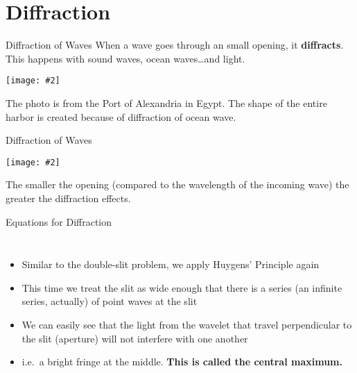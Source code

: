 \documentclass[compress,aspectratio=169]{beamer}
\newcommand{\pic}[2]{\texttt{[image: \#2]}}
\begin{document}
\section{Diffraction}

\begin{frame}{Diffraction of Waves}
  When a wave goes through an small opening, it \textbf{diffracts}. This happens
  with sound waves, ocean waves\ldots and light.
  \begin{center}
    \pic{.55}{graphics/alexandria.jpg}
  \end{center}
  The photo is from the Port of Alexandria in Egypt. The shape of the entire
  harbor is created because of diffraction of ocean wave.
\end{frame}



\begin{frame}{Diffraction of Waves}
  \begin{center}
    \pic{.6}{graphics/diffraction1.jpg}
  \end{center}
  The smaller the opening (compared to the wavelength of the incoming wave)
  the greater the diffraction effects.
\end{frame}


\begin{frame}{Equations for Diffraction}
  \begin{columns}
    
    \begin{itemize}
    \item Similar to the double-slit problem, we apply Huygens' Principle
      again
    \item This time we treat the slit as wide enough that there is a series
      (an infinite series, actually) of point waves at the slit
    \item We can easily see that the light from the wavelet that travel
      perpendicular to the slit (aperture) will not interfere with one another
    \item i.e.\ a bright fringe at the middle.
      \textbf{This is called the central maximum.}
    \end{itemize}
  \end{columns}
\end{frame}
\end{document}
